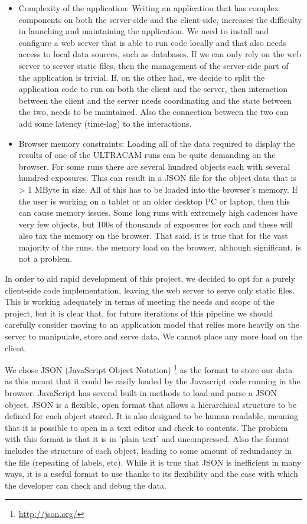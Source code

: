 \begin{itemize}
  \item Complexity of the application: Writing an application that has complex components on both the server-side and the client-side, increases the difficulty in launching and maintaining the application. We need to install and configure a web server that is able to run code locally and that also needs access to local data sources, such as databases. If we can only rely on the web server to server static files, then the management of the server-side part of the application is trivial. If, on the other had, we decide to split the application code to run on both the client and the server, then interaction between the client and the server needs coordinating and the state between the two, needs to be maintained. Also the connection between the two can add some latency (time-lag) to the interactions. 

  \item Browser memory constraints: Loading all of the data required to display the results of one of the ULTRACAM runs can be quite demanding on the browser. For some runs there are several hundred objects each with several hundred exposures. This can result in a JSON file for the object data that is > 1 MByte in size. All of this has to be loaded into the browser's memory. If the user is working on a tablet or an older desktop PC or laptop, then this can cause memory issues. Some long runs with extremely high cadences have very few objects, but 100s of thousands of exposures for each and these will also tax the memory on the browser. That said, it is true that for the vast majority of the runs, the memory load on the browser, although significant, is not a problem.   
\end{itemize}

In order to aid rapid development of this project, we decided to opt for a purely client-side code implementation, leaving the web server to serve only static files. This is working adequately in terms of meeting the needs and scope of the project, but it is clear that, for future iterations of this pipeline we should carefully consider moving to an application model that relies more heavily on the server to manipulate, store and serve data. We cannot place any more load on the client. 

We chose JSON (JavaScript Object Notation) \footnote{\url{http://json.org/}} as the format to store our data as this meant that it could be easily loaded by the Javascript code running in the browser. JavaScript has several built-in methods to load and parse a JSON object. JSON is a flexible, open format that allows a hierarchical structure to be defined for each object stored. It is also designed to be human-readable, meaning that it is possible to open in a text editor and check to contents. The problem with this format is that it is in 'plain text' and uncompressed. Also the format includes the structure of each object, leading to some amount of redundancy in the file (repeating of labels, etc). While it is true that JSON is inefficient in many ways, it is a useful format to use thanks to its flexibility and the ease with which the developer can check and debug the data. 


